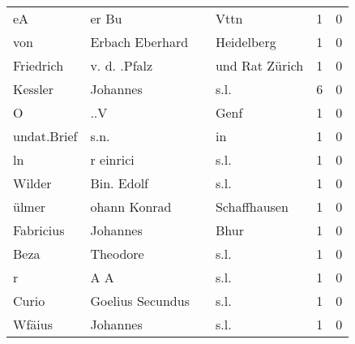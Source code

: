 \begin{tabular}{llllrr}
                       eA &                              er Bu &             &                                        Vttn &          1 &         0 \\
                      von &                    Erbach Eberhard &             &                                  Heidelberg &          1 &         0 \\
                Friedrich &                       v. d. .Pfalz &             &                              und Rat Zürich &          1 &         0 \\
                  Kessler &                           Johannes &             &                                        s.l. &          6 &         0 \\
                        O &                                ..V &             &                                        Genf &          1 &         0 \\
              undat.Brief &                               s.n. &             &                                          in &          1 &         0 \\
                       ln &                          r einrici &             &                                        s.l. &          1 &         0 \\
                   Wilder &                         Bin. Edolf &             &                                        s.l. &          1 &         0 \\
                    ülmer &                       ohann Konrad &             &                                Schaffhausen &          1 &         0 \\
                Fabricius &                           Johannes &             &                                        Bhur &          1 &         0 \\
                     Beza &                           Theodore &             &                                        s.l. &          1 &         0 \\
                        r &                                A A &             &                                        s.l. &          1 &         0 \\
                    Curio &                   Goelius Secundus &             &                                        s.l. &          1 &         0 \\
                   Wfäius &                           Johannes &             &                                        s.l. &          1 &         0 \\

\end{tabular}

